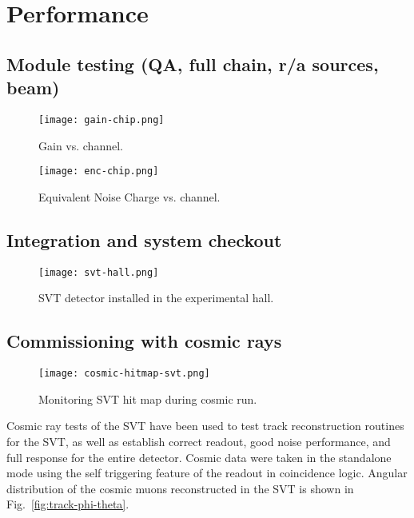 \section{Performance}

\subsection{Module testing (QA, full chain, r/a sources, beam)}

\begin{wrapfigure}{l}{0.5\columnwidth}
\texttt{[image: gain-chip.png]}
\caption{Gain vs. channel.}
\label{fig:gain-chip}
\end{wrapfigure}

\begin{wrapfigure}{l}{0.5\columnwidth}
\texttt{[image: enc-chip.png]}
\caption{Equivalent Noise Charge vs. channel.}
\label{fig:enc-chip}
\end{wrapfigure}

\subsection{Integration and system checkout}

\begin{wrapfigure}{l}{0.5\columnwidth}
\texttt{[image: svt-hall.png]}
\caption{SVT detector installed in the experimental hall.}
\label{fig:svt-hall}
\end{wrapfigure}

\subsection{Commissioning with cosmic rays}

\begin{wrapfigure}{l}{0.5\columnwidth}
\texttt{[image: cosmic-hitmap-svt.png]}
\caption{Monitoring SVT hit map during cosmic run.}
\label{fig:cosmic-hitmap-svt}
\end{wrapfigure}

Cosmic ray tests of the SVT have been used to test track reconstruction routines for the SVT, as well as establish correct readout, good noise performance, and full response for the entire detector. Cosmic data were taken in the standalone mode using the self triggering feature of the readout in coincidence logic. Angular distribution of the cosmic muons reconstructed in the SVT is shown in Fig.~\ref{fig:track-phi-theta}.

